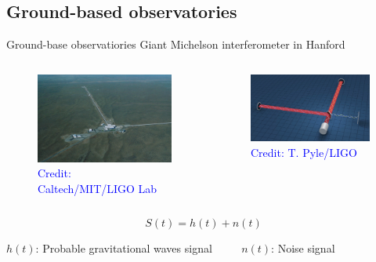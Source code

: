 \documentclass[pdf]{beamer}
\newcommand{\credit}[1]{\tiny{\textcolor{blue}{Credit: #1}}}
\begin{document}
\subsection{Ground-based observatories}
\begin{frame}{Ground-base observatiories}
Giant Michelson interferometer in Hanford
\begin{columns}
\hspace{.5cm}	
\begin{figure}
\includegraphics[width=\textwidth]{fig/HiResHanford_5.jpg}
\caption*{\credit{Caltech/MIT/LIGO Lab}}
\end{figure}
\begin{figure}
\includegraphics[width=\textwidth]{fig/IFO_SCHEME.png}
\caption*{\credit{T. Pyle/LIGO}}
\end{figure}
\end{columns}
\begin{equation*}
S(t) = h(t) + n(t)
\end{equation*}
\begin{center}
 \begin{tiny}
	$h(t)$: Probable gravitational waves signal $\qquad$ $n(t)$: Noise signal
	\end{tiny}
\end{center}
\end{frame}
\end{document}
